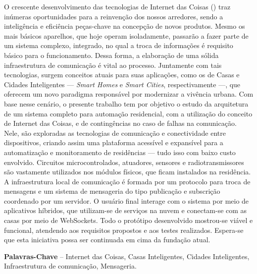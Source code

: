 \begin{resumo}

O crescente desenvolvimento das tecnologias de Internet das Coisas (\wiot) traz inúmeras oportunidades para a reinvenção dos nossos arredores, sendo a inteligência e eficiência peças-chave na concepção de novos produtos. Mesmo os mais básicos aparelhos, que hoje operam isoladamente, passarão a fazer parte de um sistema complexo, integrado, no qual a troca de informações é requisito básico para o funcionamento. Dessa forma, a elaboração de uma sólida infraestrutura de comunicação é vital ao processo. Juntamente com tais tecnologias, surgem conceitos atuais para suas aplicações, como os de Casas e Cidades Inteligentes --- \textit{Smart Homes} e \textit{Smart Cities}, respectivamente ---, que oferecem um novo paradigma responsável por modernizar a vivência urbana. Com base nesse cenário, o presente trabalho tem por objetivo o estudo da arquitetura de um sistema completo para automação residencial, com a utilização do conceito de Internet das Coisas, e de contingências no caso de falhas na comunicação. Nele, são exploradas as tecnologias de comunicação e conectividade entre dispositivos, criando assim uma plataforma acessível e expansível para a automatização e monitoramento de residências --- tudo isso com baixo custo envolvido. Circuitos microcontrolados, atuadores, sensores e radiotransmissores são vastamente utilizados nos módulos físicos, que ficam instalados na residência. A infraestrutura local de comunicação é formada por um protocolo para troca de mensagens e um sistema de mensageria do tipo publicação e subscrição coordenado por um servidor. O usuário final interage com o sistema por meio de aplicativos híbridos, que utilizam-se de serviços na nuvem e conectam-se com as casas por meio de WebSockets. Todo o protótipo desenvolvido mostrou-se viável e funcional, atendendo aos requisitos propostos e aos testes realizados. Espera-se que esta iniciativa possa ser continuada em cima da fundação atual.

%
\textbf{Palavras-Chave} -- Internet das Coisas, Casas Inteligentes, Cidades Inteligentes, Infraestrutura de comunicação, Mensageria.
\end{resumo}
